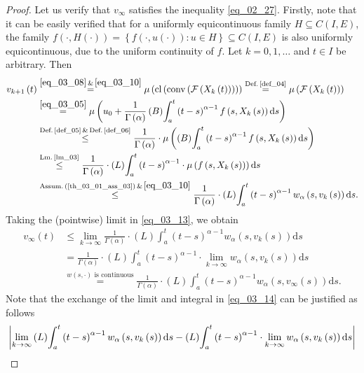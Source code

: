 \documentclass[reqno]{amsart}
\numberwithin{equation}{section}
\theoremstyle{definition}
\theoremstyle{remark}
\newcommand{\assumRef}[1]{\textrm{Assum.\,}\br{\textrm{\ref{#1}}}}
\newcommand{\Bint}[3]{\br{B}\!\displaystyle\int_{#1}^{#2}{#3}}
\newcommand{\br}[1]{\left(#1\right)}
\newcommand{\C}[2]{C\br{#1,#2}}
\newcommand{\cbr}[1]{\left\{#1\right\}}
\newcommand{\cl}[1]{\clOperator\br{#1}}
\newcommand{\conv}[1]{\convOperator\br{#1}}
\newcommand{\defRef}[1]{\textrm{Def.\,\ref{#1}}}
\newcommand{\ds}{\mathrm{d}s}
\newcommand{\eqText}[1]{\stackrel{#1}{=}}
\newcommand{\fF}{\mathcal{F}}
\newcommand{\leqText}[1]{\stackrel{#1}{\leq}}
\newcommand{\Lint}[3]{\br{L}\!\displaystyle\int_{#1}^{#2}{#3}}
\newcommand{\lmRef}[1]{\textrm{Lm.\,\ref{#1}}}
\newcommand{\st}{\!:}
\DeclareMathOperator{\clOperator}{cl}
\DeclareMathOperator{\convOperator}{conv}
\begin{document}
\begin{proof}
	Let us verify that $v_{\infty}$ satisfies the inequality \eqref{eq_02_27}. Firstly, note that it can be easily verified that for a uniformly equicontinuous family $H\subseteq\C{I}{E}$, the family $f\br{\cdot,H\br{\cdot}}=\cbr{f\br{\cdot,u\br{\cdot}}\st{u}\in{H}}\subseteq\C{I}{E}$ is also uniformly equicontinuous, due to the uniform continuity of $f$. Let $k=0,1,\dots$ and $t\in{I}$ be arbitrary. Then
	\begin{equation}\label{eq_03_13}
		\begin{aligned}
			v_{k+1}\br{t}&\eqText{\eqref{eq_03_08}\,\&\,\eqref{eq_03_10}}\mu\br{\cl{\conv{\fF\br{X_k\br{t}}}}}\eqText{\defRef{def_04}}\mu\br{\fF\br{X_k\br{t}}}\\
			&\eqText{\eqref{eq_03_05}}\mu\br{u_0+\frac{1}{\Gamma\br{\alpha}}\Bint{a}{t}{\br{t-s}^{\alpha-1}f\br{s,X_k\br{s}}\ds}}\\
			&\leqText{\defRef{def_05}\,\&\,\defRef{def_06}}\frac{1}{\Gamma\br{\alpha}}\cdot\mu\br{\Bint{a}{t}{\br{t-s}^{\alpha-1}f\br{s,X_k\br{s}}\ds}}\\
			&\leqText{\lmRef{lm_03}}\frac{1}{\Gamma\br{\alpha}}\cdot\Lint{a}{t}{\br{t-s}^{\alpha-1}\cdot\mu\br{f\br{s,X_k\br{s}}}\ds}\\
			&\leqText{\assumRef{th_03_01_ass_03}\,\&\,\eqref{eq_03_10}}\frac{1}{\Gamma\br{\alpha}}\cdot\Lint{a}{t}{\br{t-s}^{\alpha-1}{w}_{\alpha}\br{s,v_k\br{s}}\ds}.
		\end{aligned}
	\end{equation}
	Taking the (pointwise) limit in \eqref{eq_03_13}, we obtain
	\begin{equation}\label{eq_03_14}
		\begin{aligned}
			v_{\infty}\br{t}&\leq\lim_{k\rightarrow\infty}\frac{1}{\Gamma\br{\alpha}}\cdot\Lint{a}{t}{\br{t-s}^{\alpha-1}{w}_{\alpha}\br{s,v_k\br{s}}\ds}\\
			&=\frac{1}{\Gamma\br{\alpha}}\cdot\Lint{a}{t}{\br{t-s}^{\alpha-1}\cdot\lim_{k\rightarrow\infty}{w}_{\alpha}\br{s,v_k\br{s}}\ds}\\
			&\eqText{w\br{s,\cdot}\text{ is continuous}}\frac{1}{\Gamma\br{\alpha}}\cdot\Lint{a}{t}{\br{t-s}^{\alpha-1}{w}_{\alpha}\br{s,v_{\infty}\br{s}}\ds}.
		\end{aligned}
	\end{equation}
	Note that the exchange of the limit and integral in \eqref{eq_03_14} can be justified as follows
	\begin{equation}\label{eq_03_15}
		\begin{aligned}
			&\abs{\lim_{k\rightarrow\infty}\Lint{a}{t}{\br{t-s}^{\alpha-1}w_{\alpha}\br{s,v_k\br{s}}\ds}-\Lint{a}{t}{\br{t-s}^{\alpha-1}\cdot\lim_{k\rightarrow\infty}w_{\alpha}\br{s,v_k\br{s}}\ds}}\\

\end{aligned}
\end{equation}
\end{proof}
\end{document}
